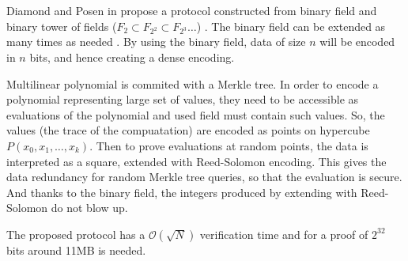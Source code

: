 Diamond and Posen in \cite{Binius} propose a protocol constructed from binary
field and binary tower of fields ($F_2 \subset F_{2^2} \subset F_{2^3}
\ldots$) \cite{TowerOfFields}. The binary field can be extended as many 
times as needed \cite{Wiedemann86}. By using the binary field, data of size
$n$ will be encoded in $n$ bits, and hence creating a dense encoding.

Multilinear polynomial is commited with a Merkle tree. In order to
encode a polynomial representing large set of values, they need to be
accessible as evaluations of the polynomial and used field must contain such
values. So, the values (the trace of the compuatation) are encoded as points on
hypercube $P(x_0, x_1, \ldots, x_k)$. Then to prove evaluations at random
points, the data is interpreted as a square, extended with Reed-Solomon
encoding. This gives the data redundancy for random Merkle tree queries, so
that the evaluation is secure. And thanks to the binary field, the integers
produced by extending with Reed-Solomon do not blow up.

The proposed protocol has a $\mathcal{O}(\sqrt{N})$ verification time and
for a proof of $2^{32}$ bits around 11MB is needed.

